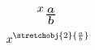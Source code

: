\documentclass{article}
\begin{document}
\[ x_{\scaleobj{2}{\frac{a}{b}}} \]
\[ x^{\stretchobj{2}{\frac{a}{b}}} \]
\end{document}
